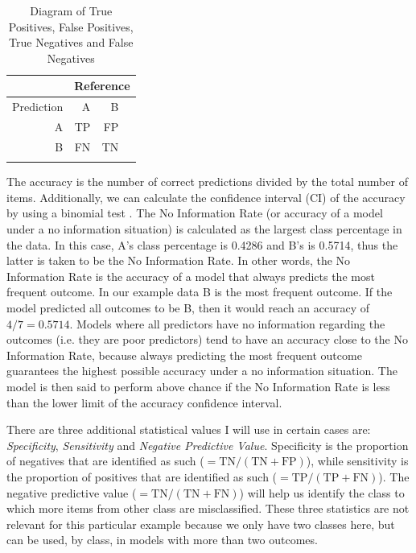 \begin{table}[!htpb]
  \centering
  \begin{tabular}{rrrr}
    \lsptoprule
               & \multicolumn{3}{c}{Reference} \\
    \midrule
    Prediction & A  & B                        \\
    A          & TP & FP                       \\
    B          & FN & TN                       \\
    \lspbottomrule
  \end{tabular}
  \caption{Diagram of True Positives, False Positives, True Negatives and False Negatives}\label{tab:tpfp-conf}
\end{table}

The accuracy is the number of correct predictions divided by the total number of items. Additionally, we can calculate the confidence interval (CI) of the accuracy by using a binomial test \autocite{Clopper.1934, Newcombe.1998}. The No Information Rate (or accuracy of a model under a no information situation) is calculated as the largest class percentage in the data. In this case, A's class percentage is 0.4286 and B's is 0.5714, thus the latter is taken to be the No Information Rate. In other words, the No Information Rate is the accuracy of a model that always predicts the most frequent outcome. In our example data B is the most frequent outcome. If the model predicted all outcomes to be B, then it would reach an accuracy of $4/7=0.5714$. Models where all predictors have no information regarding the outcomes (i.e. they are poor predictors) tend to have an accuracy close to the No Information Rate, because always predicting the most frequent outcome guarantees the highest possible accuracy under a no information situation. The model is then said to perform above chance if the No Information Rate is less than the lower limit of the accuracy confidence interval.

There are three additional statistical values I will use in certain cases are: \textit{Specificity}, \textit{Sensitivity} and \textit{Negative Predictive Value}. Specificity is the proportion of negatives that are identified as such ($=\textrm{TN}/(\textrm{TN}+\textrm{FP})$), while sensitivity is the proportion of positives that are identified as such ($=\textrm{TP}/(\textrm{TP}+\textrm{FN})$). The negative predictive value ($=\textrm{TN}/(\textrm{TN}+\textrm{FN})$) will help us identify the class to which more items from other class are misclassified. These three statistics are not relevant for this particular example because we only have two classes here, but can be used, by class, in models with more than two outcomes.

